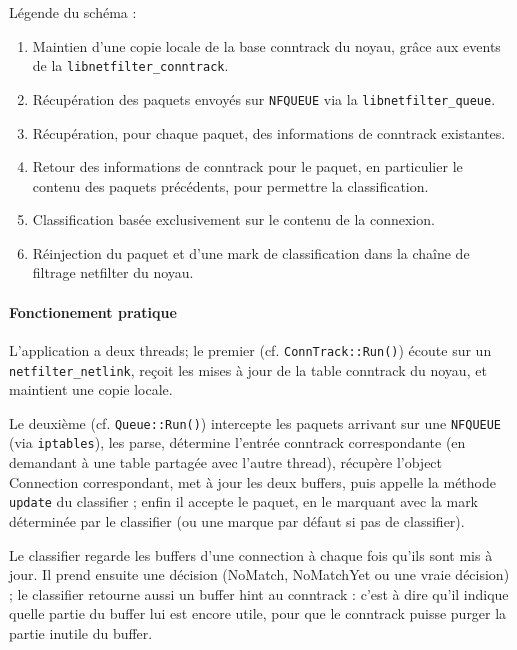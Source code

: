   \begin{footnotesize}
    \noindent Légende du schéma :
    \begin{enumerate}
    \item Maintien d'une copie locale de la base conntrack du noyau, grâce aux \og events \fg{} de la \verb+libnetfilter_conntrack+.
    \item Récupération des paquets envoyés sur \verb+NFQUEUE+ via la \verb+libnetfilter_queue+.
    \item Récupération, pour chaque paquet, des informations de conntrack existantes.
    \item Retour des informations de conntrack pour le paquet, en particulier le contenu des paquets précédents, pour permettre la classification.
    \item Classification basée exclusivement sur le contenu de la connexion.
    \item Réinjection du paquet et d'une \og mark \fg{} de classification dans la chaîne de filtrage netfilter du noyau.
    \end{enumerate}
  \end{footnotesize}

  \paragraph{Fonctionement pratique}
    L'application a deux threads; le premier (cf. \verb+ConnTrack::Run()+) écoute sur un
    \verb+netfilter_netlink+, reçoit les mises à jour de la table conntrack du noyau, et
    maintient une copie locale.
    
    Le deuxième (cf. \verb+Queue::Run()+) intercepte les paquets arrivant sur une
    \verb+NFQUEUE+ (via \verb+iptables+), les parse, détermine l'entrée conntrack
    correspondante (en demandant à une table partagée avec l'autre
    thread), récupère l'object \og Connection \fg{} correspondant, met à jour les
    deux buffers, puis appelle la méthode \verb+update+ du classifier ; enfin il
    accepte le paquet, en le marquant avec la mark déterminée par le
    classifier (ou une marque par défaut si pas de classifier).
    
    Le classifier regarde les buffers d'une connection à chaque fois qu'ils sont mis à jour.
    Il prend ensuite une décision (NoMatch, NoMatchYet ou une vraie décision) ; le classifier retourne aussi un \og buffer hint \fg{} au conntrack : c'est à dire qu'il indique quelle
    partie du buffer lui est encore utile, pour que le conntrack puisse
    purger la partie inutile du buffer.

